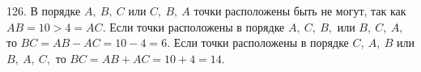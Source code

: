 126. В порядке $A,\ B,\ C$ или $C,\ B,\ A$ точки расположены быть не могут, так как $AB=10>4=AC.$ Если точки расположены в порядке $A,\ C,\ B,$ или $B,\ C,\ A,$ то $BC=AB-AC=10-4=6.$ Если точки расположены в порядке $C,\ A,\ B$ или $B,\ A,\ C,$ то $BC=AB+AC=10+4=14.$\\
